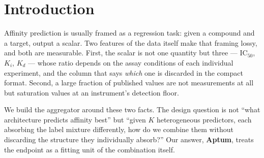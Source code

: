 \documentclass[10pt,letterpaper]{article}
\newcommand{\best}[1]{\ifmmode\mathbf{#1}\else\textbf{#1}\fi}
\begin{document}
\begin{abstract}
{floor}, not measurements, and the floor rate itself shifts between splits (73\%
validation against 57\% test) --- so that scoring against the recorded value and
scoring against the underlying measurement \textbf{reverse the method ordering}.
Calibration against the same-assay repeat floor
(\best{0.5108} log$_{10}$) re-expresses every headline number as a multiple of
measurement noise. Two negative results bound the problem: the endpoint effect is
\textbf{not separable from target family}, so ``learning the endpoint'' is ill-posed;
and the aggregate's shift-induced excess risk is \textbf{not recoverable from
unlabeled moments}. On the algorithmic side, a component designed for this problem ---
\textbf{endpoint-divergence selection} --- derives which members deserve an
endpoint-specific weight from the measured spread of their cross-endpoint rank, and
improves the interaction gain by 2.2$\times$ over a hand-chosen subset. All results
are recomputable from deposited per-member predictions
without retraining.
\end{abstract}

\section{Introduction}

Affinity prediction is usually framed as a regression task: given a compound and a
target, output a scalar. Two features of the data itself make that framing lossy, and
both are measurable. First, the scalar is not one quantity but three --- IC$_{50}$,
$K_i$, $K_d$ --- whose ratio depends on the assay conditions of each individual
experiment, and the column that says \emph{which} one is discarded in the compact
format. Second, a large fraction of published values are not measurements at all but
saturation values at an instrument's detection floor.

We build the aggregator around these two facts. The design question is not ``what
architecture predicts affinity best'' but ``given $K$ heterogeneous predictors, each
absorbing the label mixture differently, how do we combine them without discarding
the structure they individually absorb?'' Our answer, \textbf{Aptum}, treats the
endpoint as a fitting unit of the combination itself.
\end{document}
